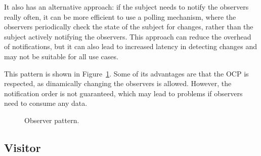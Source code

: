 It also has an alternative approach: if the subject needs to notify the observers really often, it can be more efficient to use a polling mechanism, where the observers periodically check the state of the subject for changes, rather than the subject actively notifying the observers. This approach can reduce the overhead of notifications, but it can also lead to increased latency in detecting changes and may not be suitable for all use cases.

This pattern is shown in Figure~\ref{fig:observer}. Some of its advantages are that the OCP is respected, as dinamically changing the observers is allowed. However, the notification order is not guaranteed, which may lead to problems if observers need to consume any data.
\begin{figure}
    \centering
    \caption{Observer pattern.}
    \label{fig:observer}
\end{figure}

\subsection{Visitor}

